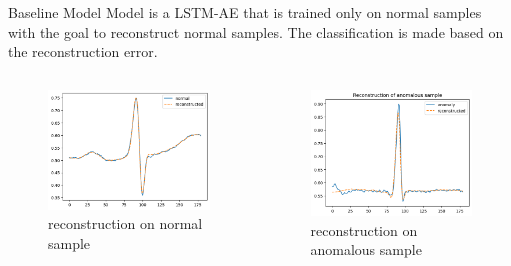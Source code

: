 \begin{frame}{Baseline Model}
    Model is a LSTM-AE that is trained only on normal samples with the goal to reconstruct normal samples. The classification is made based on the reconstruction error.
    \begin{columns}
        \begin{column}{0.48\textwidth}
        \begin{figure}
            \centering
            \includegraphics[scale=0.3]{images/rec_normal.png}
            \caption{reconstruction on normal sample \phantom{asdfsadf}}
            \label{fig:enter-label}
        \end{figure}
    \end{column}
    \begin{column}{0.48\textwidth}
        \begin{figure}
            \centering
            \includegraphics[scale=0.3]{images/rec_anom.png}
            \caption{reconstruction on anomalous sample}
            \label{fig:enter-label}
        \end{figure}
    \end{column}
    \end{columns}
\end{frame}